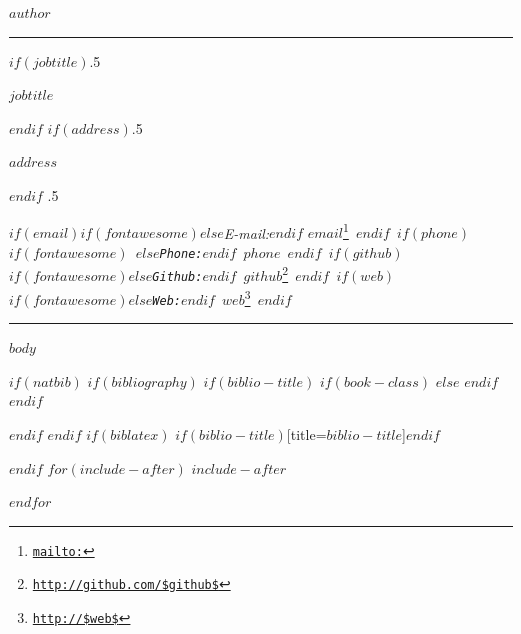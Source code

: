 \documentclass[$if(fontsize)$$fontsize$,$endif$$if(lang)$$babel-lang$,$endif$$if(papersize)$$papersize$paper,$endif$$for(classoption)$$classoption$$sep$,$endfor$]{$documentclass$}
\renewcommand{\href}[2]{#2\footnote{\url{#1}}}
\begin{document}
\centerline{\huge \bf $author$}

\vspace{2 mm}

\hrule

\vspace{2 mm}

$if(jobtitle)$\moveleft.5\hoffset\centerline{$jobtitle$}$endif$
$if(address)$\moveleft.5\hoffset\centerline{$address$}$endif$
\moveleft.5\hoffset\centerline{ $if(email)$$if(fontawesome)$\faEnvelopeO \hspace{1 mm}$else$\emph{E-mail:}$endif$ \href{mailto:}{\tt $email$} \hspace{1 mm}$endif$ $if(phone)$$if(fontawesome)$ \faPhone \hspace{1 mm}$else$\emph{Phone:}$endif$  $phone$  \hspace{1 mm} $endif$ $if(github)$$if(fontawesome)$\faGithub \hspace{1 mm}$else$\emph{Github:}$endif$ \href{http://github.com/$github$}{\tt $github$} \hspace{1 mm} $endif$   $if(web)$$if(fontawesome)$\faGlobe \hspace{1 mm}$else$\emph{Web:}$endif$ \href{http://$web$}{\tt $web$}  $endif$ }

\vspace{2 mm}

\hrule


$body$

$if(natbib)$
$if(bibliography)$
$if(biblio-title)$
$if(book-class)$
\renewcommand\bibname{$biblio-title$}
$else$
\renewcommand\refname{$biblio-title$}
$endif$
$endif$


$endif$
$endif$
$if(biblatex)$
\printbibliography$if(biblio-title)$[title=$biblio-title$]$endif$

$endif$
$for(include-after)$
$include-after$

$endfor$
\end{document}
